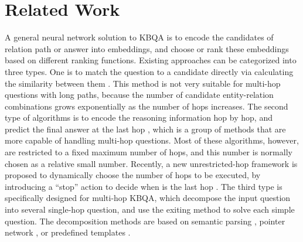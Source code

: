 \section{Related Work}
A general neural network solution to KBQA is to encode the candidates of relation path or answer into embeddings, and choose or rank these embeddings based on different ranking functions. Existing approaches can be categorized into three types. One is to match the question to a candidate directly via calculating the similarity between them \cite{DBLP:journals/corr/abs-1801-09893,DBLP:conf/adbis/YuHYZW18}. This method is not very suitable for multi-hop questions with long paths, because the number of candidate entity-relation combinations grows exponentially as the number of hops increases. The second type of algorithms is to encode the reasoning information hop by hop, and predict the final answer at the last hop \cite{DBLP:conf/emnlp/MillerFDKBW16,DBLP:conf/coling/ZhouHZ18}, which is a group of methods that are more capable of handling multi-hop questions. Most of these algorithms, however, are restricted to a fixed maximum number of hops, and this number is normally chosen as a relative small number. Recently, a new unrestricted-hop framework is proposed to dynamically choose the number of hops to be executed, by introducing a ``stop'' action to decide when is the last hop \cite{DBLP:conf/naacl/ChenCCNK19}. The third type is specifically designed for multi-hop KBQA, which decompose the input question into several single-hop question, and use the exiting method to solve each simple question. The decomposition methods are based on semantic parsing \cite{DBLP:conf/www/AbujabalYRW17,DBLP:conf/emnlp/LuoLLZ18}, pointer network \cite{DBLP:conf/acl/MinZZH19}, or predefined templates \cite{DBLP:journals/pvldb/ZhengYZC18,DBLP:journals/corr/abs-1807-09623}.  %
